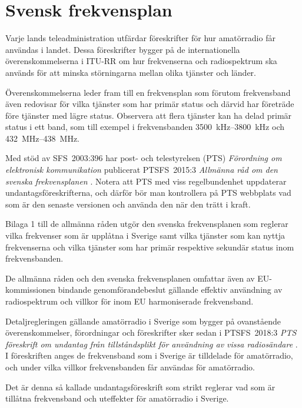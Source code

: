 \chapter{Svensk frekvensplan}
\label{svensk frekvensplan}

Varje lands teleadministration utfärdar föreskrifter för hur amatörradio får
användas i landet.
Dessa föreskrifter bygger på de internationella överenskommelserna i ITU-RR
\cite[ARTICLE 5]{ITU-RR} om hur frekvenserna och radiospektrum ska används för
att minska störningarna mellan olika tjänster och länder.

Överenskommelserna leder fram till en frekvensplan som förutom frekvensband även
redovisar för vilka tjänster som har primär status och därvid har företräde före
tjänster med lägre status.
Observera att flera tjänster kan ha delad primär status i ett band, som till
exempel i frekvensbanden \SIrange{3500}{3800}{\kilo\hertz} och
\SIrange{432}{438}{\mega\hertz}.

Med stöd av SFS~2003:396 har post- och telestyrelsen (PTS)
\emph{Förordning om elektronisk kommunikation} \cite{SFS2003:396}
publicerat PTSFS~2015:3 \emph{Allmänna råd om den svenska frekvensplanen}
\cite{PTSFS2015:3}.
Notera att PTS med viss regelbundenhet uppdaterar undantagsföreskrifterna,
och därför bör man kontrollera på PTS webbplats vad som är den senaste versionen
och använda den när den trätt i kraft.

Bilaga 1 till de allmänna råden utgör den svenska frekvensplanen som reglerar
vilka frekvenser som är upplåtna i Sverige samt vilka tjänster som kan nyttja
frekvenserna och vilka tjänster som har primär respektive sekundär status inom
frekvensbanden.

\newpage

De allmänna råden och den svenska frekvensplanen omfattar även av
EU-kommissionen bindande genomförandebeslut gällande effektiv användning av
radiospektrum och villkor för inom EU harmoniserade frekvensband.

Detaljregleringen gällande amatörradio i Sverige som bygger på ovanstående
överenskommelser, förordningar och föreskrifter sker sedan i PTSFS~2018:3
\emph{PTS föreskrift om undantag från tillståndsplikt för användning av vissa
  radiosändare} \cite{PTSFS2018:3}.
I föreskriften anges de frekvensband som i Sverige är tilldelade för
amatörradio, och under vilka villkor frekvensbanden får användas för
amatörradio.

Det är denna så kallade undantagsföreskrift som strikt reglerar vad som är
tillåtna frekvensband och uteffekter för amatörradio i Sverige.

